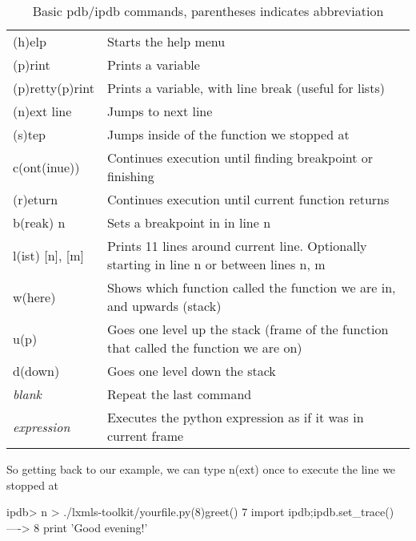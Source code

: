 \begin{table}[!h]
\begin{center}
\begin{tabular}{|l|l|}
\hline
(h)elp           & Starts the help menu\\
(p)rint          & Prints a variable\\
(p)retty(p)rint	 & Prints a variable, with line break (useful for lists)\\
\hline
(n)ext line      & Jumps to next line\\ 
(s)tep           & Jumps inside of the function we stopped at\\
c(ont(inue))     & Continues execution until finding breakpoint or finishing\\
(r)eturn         & Continues execution until current function returns\\
b(reak) n        & Sets a breakpoint in in line n\\
\hline
l(ist) [n], [m]  & Prints 11 lines around current line. Optionally starting in line n or between lines n, m\\
w(here)          & Shows which function called the function we are in, and upwards (stack\footnotemark)\\
u(p)             & Goes one level up the stack (frame of the function that called the function we are on)\\
d(down)          & Goes one level down the stack\\
\hline
\textit{blank}          & Repeat the last command\\ 
\textit{expression}     & Executes the python expression as if it was in current frame\\
\hline
\end{tabular}
\end{center}
\caption{\label{tb::pdbbasiccommands}Basic pdb/ipdb commands, parentheses indicates abbreviation}
\end{table}


So getting back to our example, we can type n(ext) once to execute the line we stopped at

\begin{python}
ipdb> n
> ./lxmls-toolkit/yourfile.py(8)greet()
      7                 import ipdb;ipdb.set_trace()
----> 8                 print 'Good evening!' 
\end{python}

